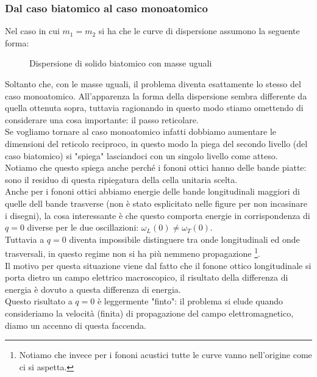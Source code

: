 \subsubsection{Dal caso biatomico al caso monoatomico}
\label{subsubsec:Dal caso biatomico al caso monoatomico}
Nel caso in cui $m_1=m_2$ si ha che le curve di dispersione assumono la seguente forma:
\begin{figure}[H]
    \centering
    \caption{Dispersione di solido biatomico con masse uguali}
    \label{fig:dispersione-di-solido-biatomico-con-masse-uguali}
\end{figure}
\noindent
Soltanto che, con le masse uguali, il problema diventa esattamente lo stesso del caso monoatomico. All'apparenza la forma della dispersione sembra differente da quella ottenuta sopra, tuttavia ragionando in questo modo stiamo omettendo di considerare una cosa importante: il passo reticolare.\\
Se vogliamo tornare al caso monoatomico infatti dobbiamo aumentare le dimensioni del reticolo reciproco, in questo modo la piega del secondo livello (del caso biatomico) si "spiega" lasciandoci con un singolo livello come atteso. Notiamo che questo spiega anche perché i fononi ottici hanno delle bande piatte: sono il residuo di questa ripiegatura della cella unitaria scelta.\\
Anche per i fononi ottici abbiamo energie delle bande longitudinali maggiori di quelle dell bande trasverse (non è stato esplicitato nelle figure per non incasinare i disegni), la cosa interessante è che questo comporta energie in corrispondenza di $q=0$ diverse per le due oscillazioni: $\omega _L(0) \neq \omega _T(0)$.\\
Tuttavia a $q=0$ diventa impossibile distinguere tra onde longitudinali ed onde trasversali, in questo regime non si ha più nemmeno propagazione \footnote{Notiamo che invece per i fononi acustici tutte le curve vanno nell'origine come ci si aspetta.}. \\
Il motivo per questa situazione viene dal fatto che il fonone ottico longitudinale si porta dietro un campo elettrico macroscopico, il risultato della differenza di energia è dovuto a questa differenza di energia. \\
Questo risultato a $q=0$ è leggermente "finto": il problema si elude quando consideriamo la velocità (finita) di propagazione del campo elettromagnetico, diamo un accenno di questa faccenda.

